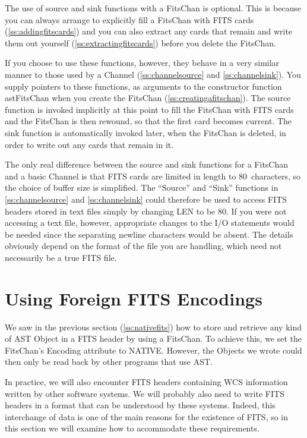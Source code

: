 \documentclass[twoside,11pt]{article}
\newcommand{\htmlref}[2]{#1}
\newcommand{\secref}[1]{\S\ref{#1}}
\renewcommand{\secref}[1]{\ref{#1}}
\begin{document}
The use of source and sink functions with a \htmlref{FitsChan}{FitsChan} is optional. This
is because you can always arrange to explicitly fill a FitsChan with
FITS cards (\secref{ss:addingfitscards}) and you can also extract any
cards that remain and write them out yourself
(\secref{ss:extractingfitscards}) before you delete the FitsChan.

If you choose to use these functions, however, they behave in a very
similar manner to those used by a \htmlref{Channel}{Channel} (\secref{ss:channelsource}
and \secref{ss:channelsink}). You supply pointers to these functions,
as arguments to the constructor function \htmlref{astFitsChan}{astFitsChan} when you create
the FitsChan (\secref{ss:creatingafitschan}). The source function is
invoked implicitly at this point to fill the FitsChan with FITS cards
and the FitsChan is then rewound, so that the first card becomes
current. The sink function is automatically invoked later, when the
FitsChan is deleted, in order to write out any cards that remain in
it.

The only real difference between the source and sink functions for a
FitsChan and a basic Channel is that FITS cards are limited in length
to 80~characters, so the choice of buffer size is simplified.  The
``Source'' and ``Sink'' functions in \secref{ss:channelsource} and
\secref{ss:channelsink} could therefore be used to access FITS headers
stored in text files simply by changing LEN to be 80.  If you were not
accessing a text file, however, appropriate changes to the I/O
statements would be needed since the separating newline characters
would be absent. The details obviously depend on the format of the
file you are handling, which need not necessarily be a true FITS file.


\cleardoublepage
\section{\label{ss:foreignfits}Using Foreign FITS Encodings}

We saw in the previous section (\secref{ss:nativefits}) how to store
and retrieve any kind of AST \htmlref{Object}{Object} in a FITS header by using a
\htmlref{FitsChan}{FitsChan}. To achieve this, we set the FitsChan's \htmlref{Encoding}{Encoding} attribute to
NATIVE. However, the Objects we wrote could then only be read back by
other programs that use AST.

In practice, we will also encounter FITS headers containing WCS
information written by other software systems.  We will probably also
need to write FITS headers in a format that can be understood by these
systems. Indeed, this interchange of data is one of the main reasons
for the existence of FITS, so in this section we will examine how to
accommodate these requirements.
\end{document}
